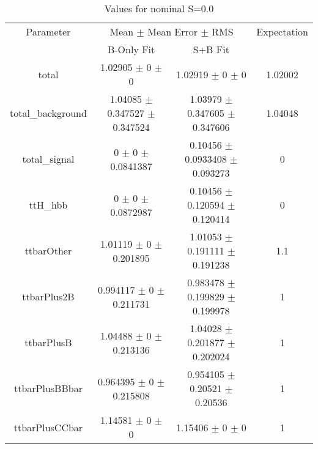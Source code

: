 \begin{table}
\centering
\caption{Values for nominal S=0.0}
\begin{tabular}{cccc}
\toprule
Parameter & \multicolumn{2}{c}{Mean $\pm$ Mean Error $\pm$ RMS} & Expectation\\
 & B-Only Fit & S+B Fit & \\
\midrule
total & \num{1.02905} $\pm$ \num{0} $\pm$ \num{0} & \num{1.02919} $\pm$ \num{0} $\pm$ \num{0} & \num{1.02002}\\
total\_background & \num{1.04085} $\pm$ \num{0.347527} $\pm$ \num{0.347524} & \num{1.03979} $\pm$ \num{0.347605} $\pm$ \num{0.347606} & \num{1.04048}\\
total\_signal & \num{0} $\pm$ \num{0} $\pm$ \num{0.0841387} & \num{0.10456} $\pm$ \num{0.0933408} $\pm$ \num{0.093273} & \num{0}\\
ttH\_hbb & \num{0} $\pm$ \num{0} $\pm$ \num{0.0872987} & \num{0.10456} $\pm$ \num{0.120594} $\pm$ \num{0.120414} & \num{0}\\
ttbarOther & \num{1.01119} $\pm$ \num{0} $\pm$ \num{0.201895} & \num{1.01053} $\pm$ \num{0.191111} $\pm$ \num{0.191238} & \num{1.1}\\
ttbarPlus2B & \num{0.994117} $\pm$ \num{0} $\pm$ \num{0.211731} & \num{0.983478} $\pm$ \num{0.199829} $\pm$ \num{0.199978} & \num{1}\\
ttbarPlusB & \num{1.04488} $\pm$ \num{0} $\pm$ \num{0.213136} & \num{1.04028} $\pm$ \num{0.201877} $\pm$ \num{0.202024} & \num{1}\\
ttbarPlusBBbar & \num{0.964395} $\pm$ \num{0} $\pm$ \num{0.215808} & \num{0.954105} $\pm$ \num{0.20521} $\pm$ \num{0.20536} & \num{1}\\
ttbarPlusCCbar & \num{1.14581} $\pm$ \num{0} $\pm$ \num{0} & \num{1.15406} $\pm$ \num{0} $\pm$ \num{0} & \num{1}\\
\bottomrule
\end{tabular}
\end{table}
